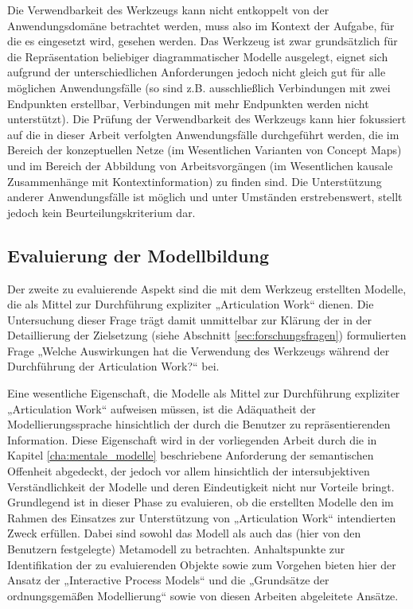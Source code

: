 Die Verwendbarkeit des Werkzeugs kann nicht entkoppelt von der Anwendungsdomäne betrachtet werden, muss also im Kontext der Aufgabe, für die es eingesetzt wird, gesehen werden. Das Werkzeug ist zwar grundsätzlich für die Repräsentation beliebiger diagrammatischer Modelle ausgelegt, eignet sich aufgrund der unterschiedlichen Anforderungen jedoch nicht gleich gut für alle möglichen Anwendungsfälle (so sind z.B. ausschließlich Verbindungen mit zwei Endpunkten erstellbar, Verbindungen mit mehr Endpunkten werden nicht unterstützt). Die Prüfung der Verwendbarkeit des Werkzeugs kann hier fokussiert auf die in dieser Arbeit verfolgten Anwendungsfälle durchgeführt werden, die im Bereich der konzeptuellen Netze (im Wesentlichen Varianten von Concept Maps) und im Bereich der Abbildung von Arbeitsvorgängen (im Wesentlichen kausale Zusammenhänge mit Kontextinformation) zu finden sind. Die Unterstützung anderer Anwendungsfälle ist möglich und unter Umständen erstrebenswert, stellt jedoch kein Beurteilungskriterium dar.

\subsection{Evaluierung der Modellbildung}
\label{sub:eval_modell}

Der zweite zu evaluierende Aspekt sind die mit dem Werkzeug erstellten Modelle, die als Mittel zur Durchführung expliziter „Articulation Work“ dienen. Die Untersuchung dieser Frage trägt damit unmittelbar zur Klärung der in der Detaillierung der Zielsetzung (siehe Abschnitt \ref{sec:forschungsfragen}) formulierten Frage „Welche Auswirkungen hat die Verwendung des Werkzeugs während der Durchführung der Articulation Work?“ bei.

Eine wesentliche Eigenschaft, die Modelle als Mittel zur Durchführung expliziter „Articulation Work“  aufweisen müssen, ist die Adäquatheit der Modellierungssprache hinsichtlich der durch die Benutzer zu repräsentierenden Information. Diese Eigenschaft wird in der vorliegenden Arbeit durch die in Kapitel \ref{cha:mentale_modelle} beschriebene Anforderung der semantischen Offenheit abgedeckt, der jedoch vor allem hinsichtlich der intersubjektiven Verständlichkeit der Modelle und deren Eindeutigkeit nicht nur Vorteile bringt. Grundlegend ist in dieser Phase zu evaluieren, ob die erstellten Modelle den im Rahmen des Einsatzes zur Unterstützung von „Articulation Work“ intendierten Zweck erfüllen. Dabei sind sowohl das Modell als auch das (hier von den Benutzern festgelegte) Metamodell zu betrachten. Anhaltspunkte zur Identifikation der zu evaluierenden Objekte sowie zum Vorgehen bieten hier der Ansatz der „Interactive Process Models“ \citep{Jorgensen04} und die „Grundsätze der ordnungsgemäßen Modellierung“ \citep{Becker00} sowie von diesen Arbeiten abgeleitete Ansätze.

